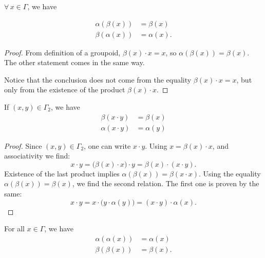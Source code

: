 \begin{lemma}
$\forall\,x\in\Gamma$, we have

\begin{subequations}
\begin{align}
\alpha(\beta(x))&=\beta(x)\\
\beta(\alpha(x))&=\alpha(x).
\end{align}
\end{subequations}
\end{lemma}

\begin{proof}
From definition of a groupoid, $\beta(x)\cdot x=x$, so $\alpha(\beta(x))=\beta(x)$. The other statement comes in the same way.

Notice that the conclusion does not come from the equality $\beta(x)\cdot x=x$, but only from the existence of the product $\beta(x)\cdot x$.
\end{proof}

\begin{lemma}
If $(x,y)\in\Gamma_{2}$, we have
\begin{subequations}
\begin{align}
\beta(x\cdot y)&=\beta(x)\\
\alpha(x\cdot y)&=\alpha(y)
\end{align}
\end{subequations}

\end{lemma}

\begin{proof}
Since $(x,y)\in \Gamma_{2}$, one can write $x\cdot y$. Using $x=\beta(x)\cdot x$, and associativity we find:
\[
  x\cdot y=\big( \beta(x)\cdot x \big)\cdot y=\beta(x)\cdot(x\cdot y).
\]
Existence of the last product implies $\alpha(\beta(x))=\beta(x\cdot x)$. Using the equality $\alpha(\beta(x))=\beta(x)$, we find the second relation. The first one is proven by the same:
\[
  x\cdot y=x\cdot \big( y\cdot\alpha(y) \big)=(x\cdot y)\cdot \alpha(x).
\]

\end{proof}

\begin{lemma}
For all $x\in\Gamma$, we have
\begin{subequations}
\begin{align}
  \alpha(\alpha(x))&=\alpha(x)\\
\beta(\beta(x))&=\beta(x).
\end{align}
\end{subequations}
\end{lemma}

